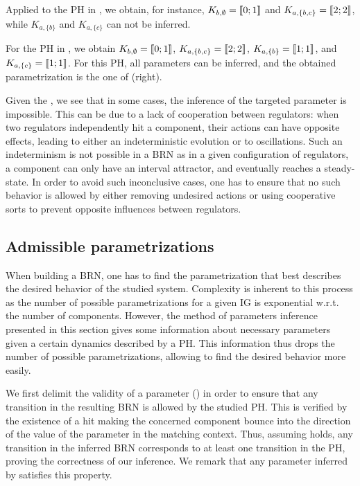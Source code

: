 \begin{example}
\label{ex:infer-param-runningPH-1}
Applied to the PH in , we obtain, for instance, 
$K_{b,\emptyset} = \llbracket 0 ; 1 \rrbracket$ and
$K_{a,\{b,c\}} = \llbracket 2 ; 2 \rrbracket$,
while $K_{a,\{b\}}$ and $K_{a,\{c\}}$ can not be inferred.
\end{example}

\begin{example}
For the PH in , we obtain
$K_{b,\emptyset} = \llbracket 0 ; 1 \rrbracket$,
$K_{a,\{b,c\}} = \llbracket 2 ; 2 \rrbracket$,
$K_{a,\{b\}} = \llbracket 1 ; 1 \rrbracket$,
and $K_{a,\{c\}} = \llbracket 1 ; 1 \rrbracket$.
For this PH, all parameters can be inferred, and the obtained parametrization is the one of (right).
\end{example}

Given the , we see that in some cases, the inference of the targeted parameter is impossible.
This can be due to a lack of cooperation between regulators: when two regulators independently hit a component, their actions can have opposite effects, leading to either an indeterministic evolution or to oscillations.
Such an indeterminism is not possible in a BRN as in a given configuration of regulators, a component can only have an interval attractor, and eventually reaches a steady-state.
In order to avoid such inconclusive cases, one has to ensure that no such behavior is allowed by
either removing undesired actions or using cooperative sorts to prevent opposite influences between
regulators.

\subsection{Admissible parametrizations}\label{ssec:admissible-K}

When building a BRN, one has to find the parametrization that best describes the desired behavior of the studied system.
Complexity is inherent to this process as the number of possible parametrizations for a given IG is exponential w.r.t. the number of components.
However, the method of parameters inference presented in this section gives some information about necessary parameters given a certain dynamics described by a PH.
This information thus drops the number of possible parametrizations, allowing to find the desired behavior more easily.

We first delimit the validity of a parameter () in order to ensure that any
transition in the resulting BRN is allowed by the studied PH.
This is verified by the existence of a hit making the concerned component bounce into the direction
of the value of the parameter in the matching context.
Thus, assuming  holds, any transition in the inferred BRN corresponds to at least
one transition in the PH, proving the correctness of our inference.
We remark that any parameter inferred by  satisfies this property.

